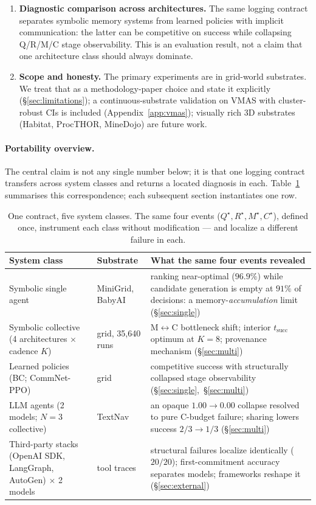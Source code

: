 \documentclass{article}
\begin{document}
\begin{enumerate}[leftmargin=20pt,itemsep=2pt,topsep=2pt]
\item \textbf{Diagnostic comparison across architectures.} The same logging contract separates symbolic memory systems from learned policies with implicit communication: the latter can be competitive on success while collapsing Q/R/M/C stage observability. This is an evaluation result, not a claim that one architecture class should always dominate.

\item \textbf{Scope and honesty.} The primary experiments are in grid-world substrates. We treat that as a methodology-paper choice and state it explicitly (\S\ref{sec:limitations}); a continuous-substrate validation on VMAS with cluster-robust CIs is included (Appendix~\ref{app:vmas}); visually rich 3D substrates (Habitat, ProcTHOR, MineDojo) are future work.
\end{enumerate}

\paragraph{Portability overview.} The central claim is not any single
number below; it is that one logging contract transfers across system
classes and returns a located diagnosis in each.
Table~\ref{tab:portability} summarises this correspondence; each
subsequent section instantiates one row.

\begin{table}[t]
\caption{One contract, five system classes. The same four events
($Q^\star,R^\star,M^\star,C^\star$), defined once, instrument each
class without modification --- and localize a different failure in
each.}
\label{tab:portability}
\centering
\small
\begin{tabular}{p{3.4cm} p{2.6cm} p{6.6cm}}
\toprule
System class & Substrate & What the same four events revealed \\
\midrule
Symbolic single agent & MiniGrid, BabyAI & ranking near-optimal ($96.9\%$) while candidate generation is empty at $91\%$ of decisions: a memory-\emph{accumulation} limit (\S\ref{sec:single}) \\
Symbolic collective (4 architectures $\times$ cadence $K$) & grid, 35{,}640 runs & M$\leftrightarrow$C bottleneck shift; interior $t_{\mathrm{succ}}$ optimum at $K{=}8$; provenance mechanism (\S\ref{sec:multi}) \\
Learned policies (BC; CommNet-PPO) & grid & competitive success with structurally collapsed stage observability (\S\ref{sec:single},~\S\ref{sec:multi}) \\
LLM agents (2 models; $N{=}3$ collective) & TextNav & an opaque $1.00\!\to\!0.00$ collapse resolved to pure C-budget failure; sharing lowers success $2/3\!\to\!1/3$ (\S\ref{sec:multi}) \\
Third-party stacks (OpenAI SDK, LangGraph, AutoGen) $\times$ 2 models & tool traces & structural failures localize identically ($20/20$); first-commitment accuracy separates models; frameworks reshape it (\S\ref{sec:external}) \\
\bottomrule
\end{tabular}
\end{table}
\end{document}
